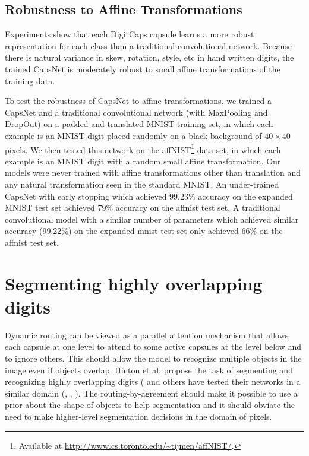 \documentclass{article}
\begin{document}
\subsection{Robustness to Affine Transformations}
Experiments show that each DigitCaps capsule learns a more robust representation for each class than a traditional convolutional network. Because there is natural variance in skew, rotation, style, etc in hand written digits, the trained CapsNet is moderately robust to small affine transformations of the training data.

To test the robustness of CapsNet to affine transformations, we trained a CapsNet and a traditional convolutional network (with MaxPooling and DropOut) on a padded and translated MNIST training set, in which each example is an MNIST digit placed randomly on a black background of $40\times40$ pixels. We then tested this network on the affNIST\footnote{Available at \url{http://www.cs.toronto.edu/~tijmen/affNIST/}.} data set, in which each example is an MNIST digit with a random small affine transformation. Our models were never trained with affine transformations other than translation and any natural transformation seen in the standard MNIST. An under-trained CapsNet with early stopping which achieved 99.23\% accuracy on the expanded MNIST test set achieved 
79\% accuracy on the affnist test set. A traditional convolutional model with a similar number of parameters which achieved similar accuracy (99.22\%) on the expanded mnist test set only achieved 66\% on the affnist test set.
\section{Segmenting highly overlapping digits}
Dynamic routing can be viewed as a parallel attention mechanism that allows each capsule at one level to attend to some active capsules at the level below and to ignore others.  This should allow the model to recognize multiple objects in the image even if objects overlap. Hinton et al. propose the task of segmenting and recognizing highly overlapping digits (\cite{hinton2000learning} and others have tested their networks in a similar domain (\cite{goodfellow2013multi}, \cite{ba}, \cite{greff2016tagger}). The routing-by-agreement should make it possible to use a prior about the shape of objects to help segmentation and it should obviate the need to make higher-level segmentation decisions in the domain of pixels. 
\end{document}
